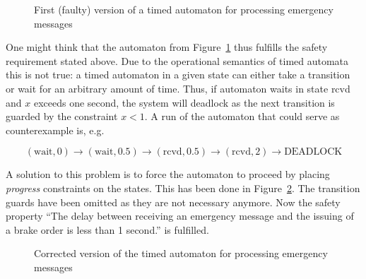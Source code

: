 \begin{figure}
\begin{center}
\end{center}
\caption{First (faulty) version of a timed automaton for processing
  emergency messages} 
\label{fig:ta:emergency1}
\end{figure}

One might think that the automaton from Figure~\ref{fig:ta:emergency1}
thus fulfills the safety requirement stated above. Due to the
operational semantics of timed automata this is not true: a timed
automaton in a given state can either take a transition or wait for an
arbitrary amount of time. Thus, if automaton waits in state rcvd and
$x$ exceeds one second, the system will deadlock as the next
transition is guarded by the constraint $x<1$. A run of the automaton
that could serve as counterexample is, e.g.

$$(\mathrm{wait},0)\rightarrow(\mathrm{wait},0.5)\rightarrow(\mathrm{rcvd},0.5)\rightarrow(\mathrm{rcvd},2)\rightarrow\textrm{DEADLOCK}$$

A solution to this problem is to force the automaton to proceed by
placing \emph{progress} constraints on the states. This has been done
in Figure~\ref{fig:ta:emergency2}. The transition guards have been
omitted as they are not necessary anymore. Now the safety property
``The delay between receiving an emergency message and the issuing of
a brake order is less than 1 second.'' is fulfilled.

\begin{figure}
\begin{center}
\small
{}
\end{center}
\caption{Corrected version of the timed automaton for processing
  emergency messages}
\label{fig:ta:emergency2}
\end{figure}

